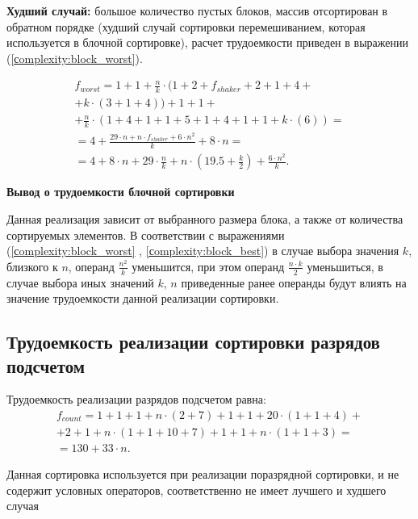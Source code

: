 \textbf{Худший случай:} большое количество пустых блоков, массив отсортирован в обратном порядке (худший случай сортировки перемешиванием, которая используется в блочной сортировке), расчет трудоемкости приведен в выражении (\ref{сomplexity:block_worst}).

\begin{equation}
	\label{сomplexity:block_worst}
	\begin{gathered}
		f_{worst} = 1 +1 + \frac{n}{k} \cdot(1 + 2+f_{shaker} + 2 + 1 + 4 + \\
		+ k \cdot (3 + 1 + 4)) + 1 + 1 + \\
		 + \frac{n}{k} \cdot (1 + 4 + 1 + 1 + 5 + 1 + 4 + 1 + 1 + k \cdot (6)) = \\
		= 4 + \frac{29\cdot n + n \cdot f_{shaker} + 6 \cdot n^2}{k}  + 8 \cdot n  = \\
		= 4 + 8 \cdot n + 29 \cdot \frac{n}{k} + n \cdot (19.5 + \frac{k}{2}) + \frac{6 \cdot n^2}{k}.
	\end{gathered}
\end{equation}


\textbf{Вывод о  трудоемкости блочной сортировки}

Данная реализация зависит от выбранного размера блока, а также от количества сортируемых элементов. В соответствии с выражениями (\ref{сomplexity:block_worst} , \ref{сomplexity:block_best}) в случае выбора значения $k$, близкого к $n$, операнд $\frac{n^2}{k}$ уменьшится, при этом операнд $\frac{n \cdot k}{2}$  уменьшиться, в случае выбора иных значений $k$, $n$ приведенные ранее операнды будут влиять на значение  трудоемкости данной реализации сортировки.


\subsection{Трудоемкость реализации сортировки разрядов подсчетом}

Трудоемкость реализации разрядов подсчетом равна:
\begin{equation}
	\label{сomplexity:count_best_worst}
	\begin{gathered}
		f_{count} = 1 + 1 + 1 + n \cdot (2 + 7)	 + 1 + 1 + 20 \cdot (1 + 1 + 4) + \\
		+ 2 + 1 + n \cdot (1 + 1 + 10 + 7) + 1 + 1 + n \cdot(1 +1 + 3) = \\
		= 130 + 33 \cdot n.
	\end{gathered}
\end{equation}

Данная сортировка используется при реализации поразрядной сортировки, и не содержит условных операторов, соответственно не имеет лучшего и худшего случая





